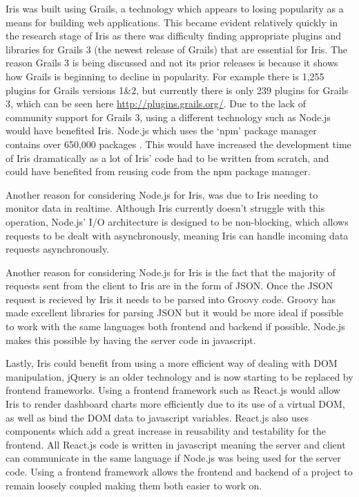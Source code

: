 \documentclass[12pt,a4paper,titlepage]{report}
\begin{document}
Iris was built using Grails, a technology which appears to losing popularity as a means for building web applications. This became evident relatively quickly in the research stage of Iris as there was difficulty finding appropriate plugins and libraries for Grails 3 (the newest release of Grails) that are essential for Iris. The reason Grails 3 is being discussed and not its prior releases is because it shows how Grails is beginning to decline in popularity. For example there is 1,255 plugins for Grails versions 1\&2, but currently there is only 239 plugins for Grails 3, which can be seen here \url{http://plugins.grails.org/}. Due to the lack of community support for Grails 3, using a different technology such as Node.js would have benefited Iris. Node.js which uses the `npm' package manager contains over 650,000 packages \parencite{ModuleCounts}. This would have increased the development time of Iris dramatically as a lot of Iris' code had to be written from scratch, and could have benefited from reusing code from the npm package manager.

Another reason for considering Node.js for Iris, was due to Iris needing to monitor data in realtime. Although Iris currently doesn't struggle with this operation, Node.js' I/O architecture is designed to be non-blocking, which allows requests to be dealt with asynchronously, meaning Iris can handle incoming data requests asynchronously.

Another reason for considering Node.js for Iris is the fact that the majority of requests sent from the client to Iris are in the form of JSON. Once the JSON request is recieved by Iris it needs to be parsed into Groovy code. Groovy has made excellent libraries for parsing JSON but it would be more ideal if possible to work with the same languages both frontend and backend if possible. Node.js makes this possible by having the server code in javascript.

Lastly, Iris could benefit from using a more efficient way of dealing with DOM manipulation, jQuery is an older technology and is now starting to be replaced by frontend frameworks. Using a frontend framework such as React.js would allow Iris to render dashboard charts more efficiently due to its use of a virtual DOM, as well as bind the DOM data to javascript variables. React.js also uses components which add a great increase in reusability and testability for the frontend. All React.js code is written in javascript meaning the server and client can communicate in the same language if Node.js was being used for the server code. Using a frontend framework allows the frontend and backend of a project to remain loosely coupled making them both easier to work on.
\end{document}
